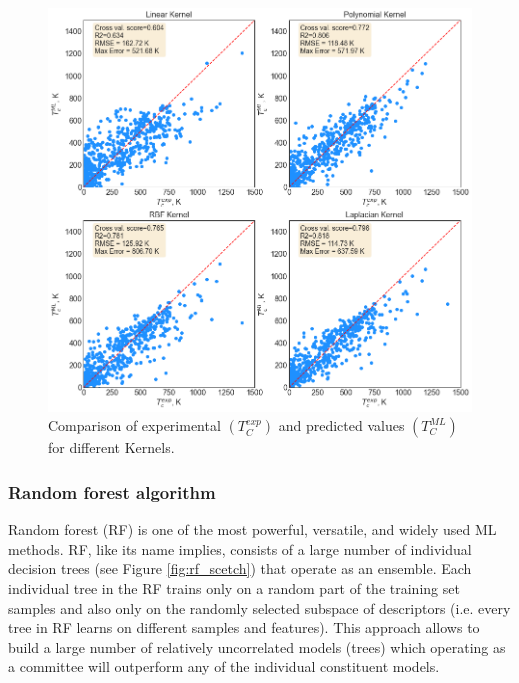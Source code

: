 \begin{figure}[H]
\centering
\captionsetup{justification=centering,margin=2cm}
	\includegraphics[width=160mm]{fig/ml_fig/krr_results.png}
	\caption[Comparison of experimental and predicted values of Curie temperature for different Kernels.]{Comparison of experimental $(T_C^{exp})$ and predicted values $(T_C^{ML})$ for different Kernels.}
\label{fig:krr_results}
\end{figure}



\subsubsection{Random forest algorithm}

Random forest (RF) is one of the most powerful, versatile, and widely used ML methods. RF, like its name implies, consists of a large number of individual decision trees (see Figure \ref{fig:rf_scetch}) that operate as an ensemble. Each individual tree in the RF trains only on a random part of the training set samples and also only on the randomly selected subspace of descriptors (i.e. every tree in RF learns on different samples and features). This approach allows to build a large number of relatively uncorrelated models (trees) which operating as a committee will outperform any of the individual constituent models.

